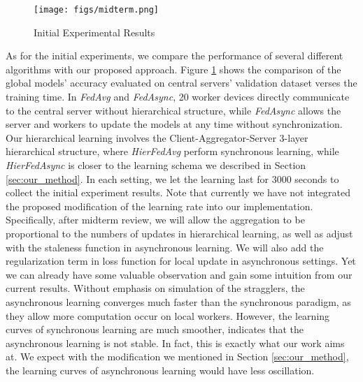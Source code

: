 \documentclass[10pt,twocolumn,letterpaper]{article}
\theoremstyle{definition}
\begin{document}
\begin{figure}[ht!]
    \centering
    \texttt{[image: figs/midterm.png]}
    \caption{Initial Experimental Results}
    \label{fig:midterm}
\end{figure}



As for the initial experiments, we compare the performance of several different algorithms with our proposed approach. %
Figure \ref{fig:midterm} shows the comparison of the global models' accuracy evaluated on central servers' validation dataset verses the training time. In \textit{FedAvg} and \textit{FedAsync}, 20 worker devices directly communicate to the central server without hierarchical structure, while \textit{FedAsync} allows the server and workers to update the models at any time without synchronization. Our hierarchical learning involves the Client-Aggregator-Server 3-layer hierarchical structure, where \textit{HierFedAvg} perform synchronous learning, while \textit{HierFedAsync} is closer to the learning schema we described in Section \ref{sec:our_method}. 
In each setting, we let the learning last for 3000 seconds to collect the initial experiment results. 
Note that currently we have not integrated the proposed modification of the learning rate into our implementation. Specifically, after midterm review, we will allow the aggregation to be proportional to the numbers of updates in hierarchical learning, as well as adjust with the staleness function in asynchronous learning. We will also add the regularization term in loss function for local update in asynchronous settings. Yet we can already have some valuable observation and gain some intuition from our current results. Without emphasis on simulation of the stragglers, the asynchronous learning converges much faster than the synchronous paradigm, as they allow more computation occur on local workers. However, the learning curves of synchronous learning are much smoother, indicates that the asynchronous learning is not stable. In fact, this is exactly what our work aims at. We expect with the modification we mentioned in Section \ref{sec:our_method}, the learning curves of asynchronous learning would have less oscillation.
\end{document}
